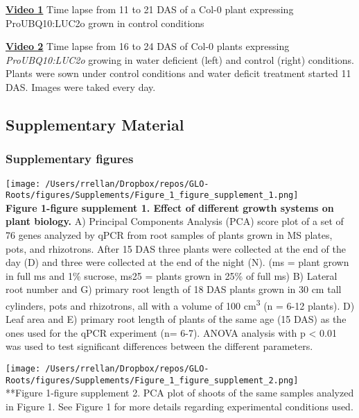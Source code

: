 \documentclass[]{article}
\begin{document}
\href{https://www.dropbox.com/s/sxjc04o0yj2faif/Video_1.avi?dl=0}{\textbf{Video
1}} Time lapse from 11 to 21 DAS of a Col-0 plant expressing
ProUBQ10:LUC2o grown in control conditions

\href{https://www.dropbox.com/s/x24x1uhvc8x0ou9/Video_3.avi?dl=0}{\textbf{Video
2}} Time lapse from 16 to 24 DAS of Col-0 plants expressing
\emph{ProUBQ10:LUC2o} growing in water deficient (left) and control
(right) conditions. Plants were sown under control conditions and water
deficit treatment started 11 DAS. Images were taked every day.


\subsection{Supplementary Material}\label{supplementary-material}

\subsubsection{Supplementary figures}\label{supplementary-figures}

\texttt{[image: /Users/rrellan/Dropbox/repos/GLO-Roots/figures/Supplements/Figure\_1\_figure\_supplement\_1.png]}\\\textbf{Figure
1-figure supplement 1. Effect of different growth systems on plant
biology.} A) Principal Components Analysis (PCA) score plot of a set of
76 genes analyzed by qPCR from root samples of plants grown in MS
plates, pots, and rhizotrons. After 15 DAS three plants were collected
at the end of the day (D) and three were collected at the end of the
night (N). (ms = plant grown in full ms and 1\% sucrose, ms25 = plants
grown in 25\% of full ms) B) Lateral root number and G) primary root
length of 18 DAS plants grown in 30 cm tall cylinders, pots and
rhizotrons, all with a volume of 100 cm\textsuperscript{3} (n = 6-12
plants). D) Leaf area and E) primary root length of plants of the same
age (15 DAS) as the ones used for the qPCR experiment (n= 6-7). ANOVA
analysis with p \textless{} 0.01 was used to test significant
differences between the different parameters.



\texttt{[image: /Users/rrellan/Dropbox/repos/GLO-Roots/figures/Supplements/Figure\_1\_figure\_supplement\_2.png]}\\**Figure
1-figure supplement 2. PCA plot of shoots of the same samples analyzed
in Figure 1. See Figure 1 for more details regarding experimental
conditions used.
\end{document}
